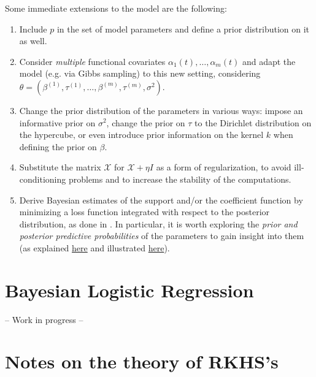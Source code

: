 \documentclass[
  a4paper,
	fontsize=11pt, %
	twoside=false, %
  secnumdepth=2,
	numbers=noenddot, %
]{kaohandt}
\begin{document}
Some immediate extensions to the model are the following:
\begin{enumerate}

  \item Include \(p\) in the set of model parameters and define a prior distribution on it as well.

  \item Consider \textit{multiple} functional covariates \(\alpha_1(t), \dots, \alpha_m(t)\) and adapt the model (e.g. via Gibbs sampling) to this new setting, considering \(\theta=(\beta^{(1)}, \tau^{(1)}, \dots, \beta^{(m)}, \tau^{(m)}, \sigma^2)\).

  \item Change the prior distribution of the parameters in various ways: impose an informative prior on \(\sigma^2\), change the prior on \(\tau\) to the Dirichlet distribution on the hypercube, or even introduce prior information on the kernel \(k\) when defining the prior on \(\beta\).

  \item Substitute the matrix \(\mathcal X\) for \(\mathcal X + \eta I\) as a form of regularization, to avoid ill-conditioning problems and to increase the stability of the computations.

  \item Derive Bayesian estimates of the support and/or the coefficient function by minimizing a loss function integrated with respect to the posterior distribution, as done in . In particular, it is worth exploring the \textit{prior and posterior predictive probabilities} of the parameters to gain insight into them (as explained \href{https://en.wikipedia.org/wiki/Bayesian_inference#Bayesian_prediction}{here} and illustrated \href{https://docs.pymc.io/en/stable/pymc-examples/examples/diagnostics_and_criticism/posterior_predictive.html}{here}).

\end{enumerate}

\section{Bayesian Logistic Regression}

-- Work in progress --

\section{Notes on the theory of RKHS's}
\end{document}
